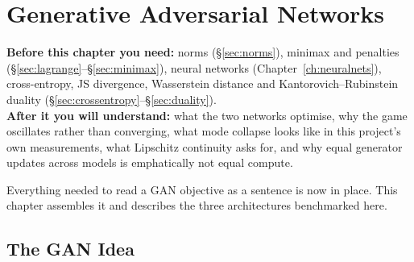 \chapter{Generative Adversarial Networks}
\label{ch:gans}

\begin{tcolorbox}[feynbox={Sky}{BBg},title={Before and After}]
\textbf{Before this chapter you need:} norms (\S\ref{sec:norms}), minimax and
penalties (\S\ref{sec:lagrange}--\S\ref{sec:minimax}), neural networks
(Chapter~\ref{ch:neuralnets}), cross-entropy, JS divergence, Wasserstein distance
and Kantorovich--Rubinstein duality
(\S\ref{sec:crossentropy}--\S\ref{sec:duality}).\\
\textbf{After it you will understand:} what the two networks optimise, why the
game oscillates rather than converging, what mode collapse looks like in this
project's own measurements, what Lipschitz continuity asks for, and why equal
generator updates across models is emphatically not equal compute.
\end{tcolorbox}

Everything needed to read a GAN objective as a sentence is now in place. This
chapter assembles it and describes the three architectures benchmarked here.

\section{The GAN Idea}
\label{sec:ganidea}



